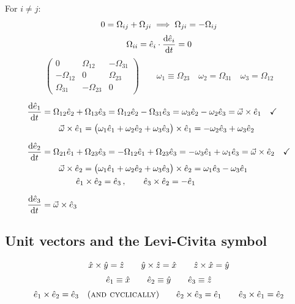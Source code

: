 \documentclass[11pt]{article}
\newcommand{\ehat}[1]{\hat{e}_{#1}}
\begin{document}
For $i\neq j$:
\begin{gather*}
0 = \Omega_{ij}+\Omega_{ji} \;\Longrightarrow\; \Omega_{ji} = -\Omega_{ij}\\[2pt]
\Omega_{ii} = \ehat{i}\cdot\frac{\d\ehat{i}}{\d t} = 0
\end{gather*}
\begin{equation*}
\begin{pmatrix}
0 & \Omega_{12} & -\Omega_{31}\\
-\Omega_{12} & 0 & \Omega_{23}\\
\Omega_{31} & -\Omega_{23} & 0
\end{pmatrix}
\qquad
\omega_1 \equiv \Omega_{23}\quad \omega_2 = \Omega_{31}\quad \omega_3 = \Omega_{12}
\end{equation*}

\begin{align*}
\frac{\d\ehat{1}}{\d t} &= \Omega_{12}\ehat{2} + \Omega_{13}\ehat{3}
= \Omega_{12}\ehat{2} - \Omega_{31}\ehat{3}
= \omega_3\ehat{2} - \omega_2\ehat{3} = \vec{\omega}\times\ehat{1}\quad\checkmark\\
&\qquad \vec{\omega}\times\ehat{1} = \bigl(\omega_1\ehat{1}+\omega_2\ehat{2}+\omega_3\ehat{3}\bigr)\times\ehat{1}
= -\omega_2\ehat{3}+\omega_3\ehat{2}\\[6pt]
\frac{\d\ehat{2}}{\d t} &= \Omega_{21}\ehat{1} + \Omega_{23}\ehat{3}
= -\Omega_{12}\ehat{1} + \Omega_{23}\ehat{3}
= -\omega_3\ehat{1} + \omega_1\ehat{3} = \vec{\omega}\times\ehat{2}\quad\checkmark\\
&\qquad \vec{\omega}\times\ehat{2} = \bigl(\omega_1\ehat{1}+\omega_2\ehat{2}+\omega_3\ehat{3}\bigr)\times\ehat{2}
= \omega_1\ehat{3} - \omega_3\ehat{1}\\
&\qquad\qquad \ehat{1}\times\ehat{2} = \ehat{3}\,,\qquad \ehat{3}\times\ehat{2} = -\ehat{1}\\[6pt]
\frac{\d\ehat{3}}{\d t} &= \vec{\omega}\times\ehat{3}
\end{align*}

\subsection*{Unit vectors and the Levi-Civita symbol}

\begin{gather*}
\hat{x}\times\hat{y} = \hat{z}\qquad \hat{y}\times\hat{z} = \hat{x}\qquad \hat{z}\times\hat{x} = \hat{y}\\[2pt]
\ehat{1}\equiv\hat{x}\qquad \ehat{2}\equiv\hat{y}\qquad \ehat{3}\equiv\hat{z}\\[2pt]
\ehat{1}\times\ehat{2} = \ehat{3} \quad(\text{\textsc{and cyclically}})\qquad
\ehat{2}\times\ehat{3} = \ehat{1}\qquad \ehat{3}\times\ehat{1} = \ehat{2}
\end{gather*}
\end{document}
